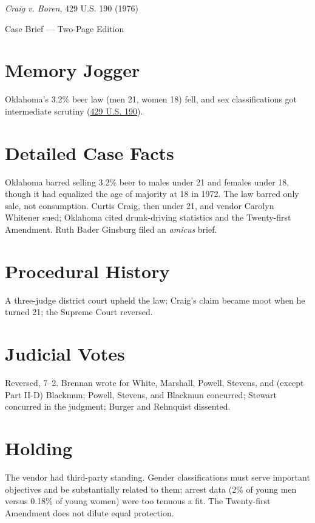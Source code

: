 \documentclass[12pt]{article}
\begin{document}
\begin{center}
{\LARGE \textit{Craig v. Boren}, 429 U.S. 190 (1976)\par}
\vspace{0.5em}
{\large Case Brief --- Two-Page Edition\par}
\end{center}

\section{Memory Jogger}
Oklahoma's 3.2\% beer law (men 21, women 18) fell, and sex classifications got intermediate scrutiny (\href{https://supreme.justia.com/cases/federal/us/429/190/}{429 U.S. 190}).

\section{Detailed Case Facts}
Oklahoma barred selling 3.2\% beer to males under 21 and females under 18, though it had equalized the age of majority at 18 in 1972. The law barred only sale, not consumption. Curtis Craig, then under 21, and vendor Carolyn Whitener sued; Oklahoma cited drunk-driving statistics and the Twenty-first Amendment. Ruth Bader Ginsburg filed an \textit{amicus} brief.

\section{Procedural History}
A three-judge district court upheld the law; Craig's claim became moot when he turned 21; the Supreme Court reversed.

\section{Judicial Votes}
Reversed, 7--2. Brennan wrote for White, Marshall, Powell, Stevens, and (except Part II-D) Blackmun; Powell, Stevens, and Blackmun concurred; Stewart concurred in the judgment; Burger and Rehnquist dissented.

\section{Holding}
The vendor had third-party standing. Gender classifications must serve important objectives and be substantially related to them; arrest data (2\% of young men versus 0.18\% of young women) were too tenuous a fit. The Twenty-first Amendment does not dilute equal protection.
\end{document}
